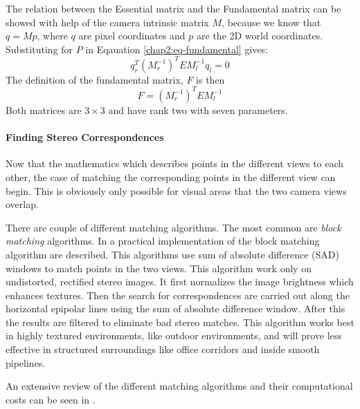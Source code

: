The relation between the Essential matrix and the Fundamental matrix can be showed with
help of the camera intrinsic matrix $M$, because we know that $q = Mp$, where $q$ are
pixel coordinates and $p$ are the 2D world coordinates. Substituting for $P$ in Eqauation
\eqref{chap2:eq-fundamental} gives: \cite{openCV}
\begin{equation}
    q_r^T(M_r^{-1})^T E M_l^{-1} q_l = 0
\end{equation}
The definition of the fundamental matrix, $F$ is then
\begin{equation}
    F = (M_r^{-1})^T E M_l^{-1}
\end{equation}
Both matrices are $3\times3$ and have rank two with seven parameters.


\paragraph{Finding Stereo Correspondences}
Now that the mathematics which describes points in the different views to each other, the
case of matching the corresponding points in the different view can begin. 
This is obviously only possible for visual areas that the two camera views overlap. 

There are couple of different matching algorithms. The most common are \emph{block
matching} algorithms. In \cite{konolige} a practical implementation of the block
matching algorithm are described. This algorithms use sum of absolute difference (SAD) windows to match 
points in the two views. This algorithm work only on undistorted, rectified stereo
images. It first normalizes the image brightness which enhances textures. Then the search
for correspondences are carried out along the horizontal epipolar lines using the sum of
absolute difference window. After this the results are filtered to eliminate bad stereo
matches. This algorithm works best in highly textured environments, like outdoor
environments, and will prove less effective in structured surroundings like office
corridors and inside smooth pipelines. 

An extensive review of the different matching algorithms and their computational costs
can be seen in \cite{stereo-algorithms}.


